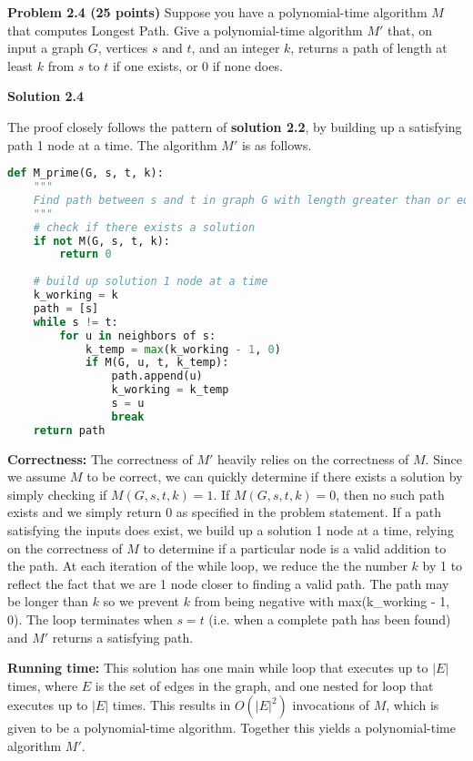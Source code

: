 \documentclass[11pt]{article}
\begin{document}
\newpage

\textbf{Problem 2.4 (25 points)} Suppose you have a polynomial-time algorithm $M$ that computes Longest Path. Give a polynomial-time algorithm $M'$ that, on input a graph $G$, vertices $s$ and $t$, and an integer $k$, returns a path of length at least $k$ from $s$ to $t$ if one exists, or 0 if none does.

\textbf{Solution 2.4}

The proof closely follows the pattern of \textbf{solution 2.2}, by building up a satisfying path 1 node at a time. The algorithm $M'$ is as follows.


\begin{lstlisting}[language=Python]
def M_prime(G, s, t, k):
    """
    Find path between s and t in graph G with length greater than or equal to k
    """
    # check if there exists a solution
    if not M(G, s, t, k):
        return 0
    
    # build up solution 1 node at a time
    k_working = k
    path = [s]
    while s != t:
        for u in neighbors of s:
            k_temp = max(k_working - 1, 0)
            if M(G, u, t, k_temp):
                path.append(u)
                k_working = k_temp
                s = u
                break
    return path
\end{lstlisting}

\textbf{Correctness:} The correctness of $M'$ heavily relies on the correctness of $M$. Since we assume $M$ to be correct, we can quickly determine if there exists a solution by simply checking if $M(G, s, t, k) = 1$. If $M(G, s, t, k) = 0$, then no such path exists and we simply return 0 as specified in the problem statement. If a path satisfying the inputs does exist, we build up a solution 1 node at a time, relying on the correctness of $M$ to determine if a particular node is a valid addition to the path. At each iteration of the while loop, we reduce the the number $k$ by 1 to reflect the fact that we are 1 node closer to finding a valid path. The path may be longer than $k$ so we prevent $k$ from being negative with max(k\_working - 1, 0). The loop terminates when $s = t$ (i.e. when a complete path has been found) and $M'$ returns a satisfying path.

\textbf{Running time:} This solution has one main while loop that executes up to $|E|$ times, where $E$ is the set of edges in the graph, and one nested for loop that executes up to $|E|$ times. This results in $O(|E|^2)$ invocations of $M$, which is given to be a polynomial-time algorithm. Together this yields a polynomial-time algorithm $M'$.
\end{document}
